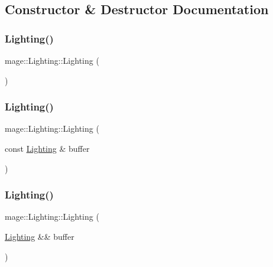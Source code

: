 \subsection{Constructor \& Destructor Documentation}
\hypertarget{structmage_1_1_lighting_a7017afad521df6eacf2c45ae0f5adfd5}{}\label{structmage_1_1_lighting_a7017afad521df6eacf2c45ae0f5adfd5} 
\subsubsection{\texorpdfstring{Lighting()}{Lighting()}\hspace{0.1cm}{\footnotesize\ttfamily [1/3]}}
{\footnotesize\ttfamily mage\+::\+Lighting\+::\+Lighting (\begin{DoxyParamCaption}{ }\end{DoxyParamCaption})\hspace{0.3cm}{\ttfamily [default]}}

\hypertarget{structmage_1_1_lighting_ae92175ad94cc88badf2dc4fd93cb2e2f}{}\label{structmage_1_1_lighting_ae92175ad94cc88badf2dc4fd93cb2e2f} 
\subsubsection{\texorpdfstring{Lighting()}{Lighting()}\hspace{0.1cm}{\footnotesize\ttfamily [2/3]}}
{\footnotesize\ttfamily mage\+::\+Lighting\+::\+Lighting (\begin{DoxyParamCaption}\item[{const \hyperlink{structmage_1_1_lighting}{Lighting} \&}]{buffer }\end{DoxyParamCaption})\hspace{0.3cm}{\ttfamily [default]}}

\hypertarget{structmage_1_1_lighting_a03ce177d02db1f7ee2b779aa4cb321c1}{}\label{structmage_1_1_lighting_a03ce177d02db1f7ee2b779aa4cb321c1} 
\subsubsection{\texorpdfstring{Lighting()}{Lighting()}\hspace{0.1cm}{\footnotesize\ttfamily [3/3]}}
{\footnotesize\ttfamily mage\+::\+Lighting\+::\+Lighting (\begin{DoxyParamCaption}\item[{\hyperlink{structmage_1_1_lighting}{Lighting} \&\&}]{buffer }\end{DoxyParamCaption})\hspace{0.3cm}{\ttfamily [default]}}

